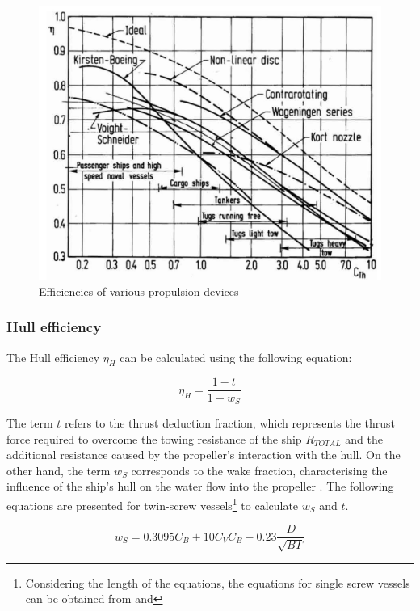 \begin{figure}[ht]
    \centering
        \includegraphics[width=.8\textwidth]{02_figures/Breslin94_openwater_eff.jpg}
        \caption{Efficiencies of various propulsion devices }
        \label{fig:breslin_open water efficiencies}
\end{figure}


\subsubsection*{Hull efficiency}

The Hull efficiency $\eta_H$ can be calculated using the following equation:

\begin{equation}
    \label{eqn:hull_eff}
    \eta_H = \frac{1 - t}{1 - w_S}
\end{equation}

The term $t$ refers to the thrust deduction fraction, which represents the thrust force required to overcome the towing resistance of the ship $R_{TOTAL}$ and the additional resistance caused by the propeller's interaction with the hull. On the other hand, the term $w_S$ corresponds to the wake fraction, characterising the influence of the ship's hull on the water flow into the propeller . The following equations are presented for twin-screw vessels\footnote{Considering the length of the equations, the equations for single screw vessels can be obtained from  and } to calculate $w_S$ and $t$.

\begin{equation}
    \label{eqn:wake_ws}
    w_S = 0.3095 C_B + 10 C_V C_B -0.23 \frac{D}{\sqrt{BT}}
\end{equation}


